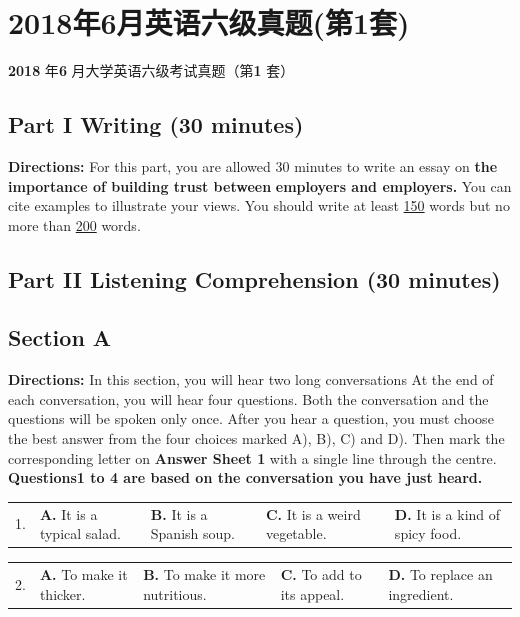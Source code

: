 \documentclass[UTF8,11pt]{ctexart}
\begin{document}
\section*{2018年6月英语六级真题(第1套)}
\textbf{2018} 年\textbf{6} 月大学英语六级考试真题（第\textbf{1} 套）


\subsection*{\textbf{Part I} \textbf{Writing} \textbf{(30 minutes)}}


\textbf{Directions:} For this part, you are allowed 30 minutes to write an essay on\textbf{ the importance of building trust between} \textbf{employers and employers.} You can cite examples to illustrate your views. You should write at least \uline{150} words but no more than \uline{200} words.


\subsection*{\textbf{Part II} \textbf{Listening Comprehension} \textbf{(30 minutes)}}


\subsection*{\textbf{Section A}}


\textbf{Directions:} In this section, you will hear two long conversations At the end of each conversation, you will hear four questions. Both the conversation and the questions will be spoken only once. After you hear a question, you must choose the best answer from the four choices marked A), B), C) and D). Then mark the corresponding letter on\textbf{ Answer Sheet 1} with a single line through the centre. \textbf{Questions1 to 4 are based on the conversation you have just heard.}


\noindent\begin{tabularx}{\linewidth}{@{}lXXXX@{}}1. & \textbf{A.} It is a typical salad. & \textbf{B.} It is a Spanish soup. & \textbf{C.} It is a weird vegetable. & \textbf{D.} It is a kind of spicy food.\\\end{tabularx}\par

\noindent\begin{tabularx}{\linewidth}{@{}lXXXX@{}}2. & \textbf{A.} To make it thicker. & \textbf{B.} To make it more nutritious. & \textbf{C.} To add to its appeal. & \textbf{D.} To replace an ingredient.\\\end{tabularx}\par
\end{document}
